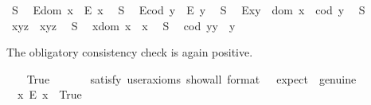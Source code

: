 \begin{isabellebody}
\begin{isamarkuptext}
\end{isamarkuptext}\isamarkuptrue%
\ S{}{\isacharcolon}\ %
\ {\isachardoublequoteopen}E{\isacharparenleft}dom\ x{\isacharparenright}\ \isactrlbold {\isasymrightarrow}\ E\ x{\isachardoublequoteclose}\ \isanewline
\ S{}{\isacharcolon}\ %
\ {\isachardoublequoteopen}E{\isacharparenleft}cod\ y{\isacharparenright}\ \isactrlbold {\isasymrightarrow}\ E\ y{\isachardoublequoteclose}\ \isanewline
\ S{}{\isacharcolon}\ %
\ {\isachardoublequoteopen}E{\isacharparenleft}x{\isasymcdot}y{\isacharparenright}\ \isactrlbold {\isasymleftrightarrow}\ dom\ x\ {\isasymsimeq}\ cod\ y{\isachardoublequoteclose}\ \isanewline
\ S{}{\isacharcolon}\ %
\ {\isachardoublequoteopen}x{\isasymcdot}{\isacharparenleft}y{\isasymcdot}z{\isacharparenright}\ {\isasymcong}\ {\isacharparenleft}x{\isasymcdot}y{\isacharparenright}{\isasymcdot}z{\isachardoublequoteclose}\ \isanewline
\ S{}{\isacharcolon}\ %
\ {\isachardoublequoteopen}x{\isasymcdot}{\isacharparenleft}dom\ x{\isacharparenright}\ {\isasymcong}\ x{\isachardoublequoteclose}\ \isanewline
\ S{}{\isacharcolon}\ %
\ {\isachardoublequoteopen}{\isacharparenleft}cod\ y{\isacharparenright}{\isasymcdot}y\ {\isasymcong}\ y{\isachardoublequoteclose}%
\begin{isamarkuptext}%
The obligatory consistency check is again positive.%
\end{isamarkuptext}\isamarkuptrue%
\ \ \isamarkupfalse%
\ True\ %
\isanewline
\ \ \ \ \isamarkupfalse%
\ {\isacharbrackleft}satisfy{\isacharcomma}\ user{\isacharunderscore}axioms{\isacharcomma}\ show{\isacharunderscore}all{\isacharcomma}\ format\ {\isacharequal}\ {}{\isacharcomma}\ expect\ {\isacharequal}\ genuine{\isacharbrackright}%
\isadelimproof
\ %
\endisadelimproof
%
\isatagproof
{}\isamarkupfalse%
%
\endisatagproof
{\isafoldproof}%
%
\isadelimproof
%
\endisadelimproof
\ \isanewline
\ \ \isamarkupfalse%
\ \ {\isachardoublequoteopen}{\isasymexists}x{\isachardot}\ \isactrlbold {\isasymnot}{\isacharparenleft}E\ x{\isacharparenright}{\isachardoublequoteclose}\ \ True\ \ %

\end{isabellebody}
